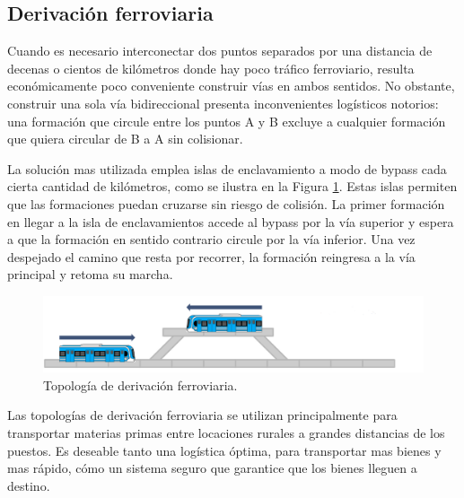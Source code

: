 \subsection{Derivación ferroviaria}

Cuando es necesario interconectar dos puntos separados por una distancia de decenas o cientos de kilómetros donde hay poco tráfico ferroviario, resulta económicamente poco conveniente construir vías en ambos sentidos. No obstante, construir una sola vía bidireccional presenta inconvenientes logísticos notorios: una formación que circule entre los puntos A y B excluye a cualquier formación que quiera circular de B a A sin colisionar. %

La solución mas utilizada emplea islas de enclavamiento a modo de bypass cada cierta cantidad de kilómetros, como se ilustra en la Figura \ref{fig:bypass_1}. Estas islas permiten que las formaciones puedan cruzarse sin riesgo de colisión. La primer formación en llegar a la isla de enclavamientos accede al bypass por la vía superior y espera a que la formación en sentido contrario circule por la vía inferior. Una vez despejado el camino que resta por recorrer, la formación reingresa a la vía principal y retoma su marcha.

    \begin{figure}[h]
        \centering
        \includegraphics[width=1\textwidth]{Figuras/bypass}
        \centering\caption{Topología de derivación ferroviaria.}
        \label{fig:bypass_1}
    \end{figure}
    
Las topologías de derivación ferroviaria se utilizan principalmente para transportar materias primas entre locaciones rurales a grandes distancias de los puestos. Es deseable tanto una logística óptima, para transportar mas bienes y mas rápido, cómo un sistema seguro que garantice que los bienes lleguen a destino.